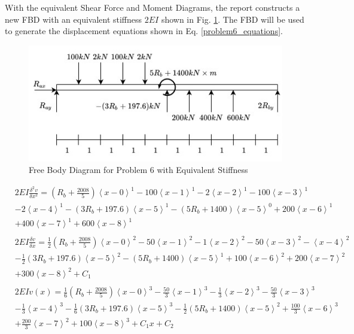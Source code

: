 \documentclass[a4paper]{article}
\begin{document}
With the equivalent Shear Force and Moment Diagrams, the report constructs a new FBD with an equivalent stiffness $2EI$ shown in Fig. \ref{FBD_6_new}. The FBD will be used to generate the displacement equations shown in Eq. \ref{problem6_equations}.

\begin{figure}[h]
\includegraphics[width=\textwidth]{FBD/FBD_6_new.jpg}
\caption{Free Body Diagram for Problem 6 with Equivalent Stiffness}
\label{FBD_6_new}
\end{figure}

\begin{equation}
    \begin{split}
& 2EI \frac{\delta^2 v}{\delta x^2} = \left(R_b + \frac{2008}{5}\right)\left<x-0\right>^1 - 100\left<x-1\right>^1 -  2\left<x-2\right>^1 - 100\left<x-3\right>^1  \\
& - 2\left<x-4\right>^1 - \left(3R_b + 197.6\right)\left<x-5\right>^1 - \left(5R_b + 1400\right)\left<x-5\right>^0 + 200\left<x-6\right>^1 \\
& + 400\left<x-7\right>^1 + 600\left<x-8\right>^1  \\
& \\
& 2EI \frac{\delta v}{\delta x} = \frac{1}{2}\left(R_b + \frac{2008}{5}\right)\left<x-0\right>^2 - 50\left<x-1\right>^2 -  1\left<x-2\right>^2 - 50\left<x-3\right>^2 - \left<x-4\right>^2 \\
& - \frac{1}{2}\left(3R_b + 197.6\right)\left<x-5\right>^2 - \left(5R_b + 1400\right)\left<x-5\right>^1 + 100\left<x-6\right>^2 + 200\left<x-7\right>^2 \\
& + 300\left<x-8\right>^2 + C_1 \\
& \\
& 2EI v(x) = \frac{1}{6}\left(R_b + \frac{2008}{5}\right)\left<x-0\right>^3 - \frac{50}{3}\left<x-1\right>^3 -  \frac{1}{3}\left<x-2\right>^3 - \frac{50}{3}\left<x-3\right>^3  \\
& - \frac{1}{3}\left<x-4\right>^3 - \frac{1}{6}\left(3R_b + 197.6\right)\left<x-5\right>^3 - \frac{1}{2}\left(5R_b + 1400\right)\left<x-5\right>^2 + \frac{100}{3}\left<x-6\right>^3  \\
& + \frac{200}{3}\left<x-7\right>^2 + 100\left<x-8\right>^3 + C_1x + C_2 \\
    \end{split}
\label{problem6_equations}
\end{equation}
\end{document}
